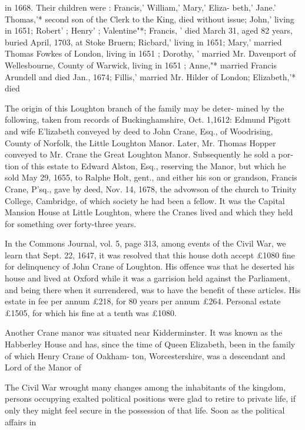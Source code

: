 \documentclass{book}
\begin{document}
in 1668. Their children were : Francis,' William,' Mary,' Eliza- 
beth,' Jane.' Thomas,'* second son of the Clerk to the King, 
died without issue; John,' living in 1651; Robert' ; Henry' ; 
Valentine"*; Francis, ' died March 31, aged 82 years, buried 
April, 1703, at Stoke Bruern; Ricbard,' living in 1651; Mary,' 
married Thomas Fowkes of London, living in 1651 ; Dorothy, ' 
married Mr. Davenport of Wellesbourne, County of Warwick, 
living in 1651 ; Anne,"* married Francis Arundell and died Jan., 
1674; Fillis,' married Mr. Hilder of London; Elizabeth,'* died 

The origin of this Loughton branch of the family may be deter- 
mined by the following, taken from records of Buckinghamshire, 
Oct. 1,1612: Edmund Pigott and wife E'lizabeth conveyed by deed 
to John Crane, Esq., of Woodrising, County of Norfolk, the Little 
Loughton Manor. Later, Mr. Thomas Hopper conveyed to Mr. 
Crane the Great Loughton Manor. Subsequently he sold a por- 
tion of this estate to Edward Alston, Esq., reserving the Manor, 
but which he sold May 29, 1655, to Ralphe Holt, gent., and 
either his son or grandson, Francis Crane, P'sq., gave by deed, 
Nov. 14, 1678, the advowson of the church to Trinity College, 
Cambridge, of which society he had been a fellow. It was the 
Capital Mansion House at Little Loughton, where the Cranes 
lived and which they held for something over forty-three years. 

In the Commons Journal, vol. 5, page 313, among events of the 
Civil War, we learn that Sept. 22, 1647, it was resolved that this 
house doth accept £1080 fine for delinquency of John Crane of 
Loughton. His offence was that he deserted his house and lived 
at Oxford while it was a garrision held against the Parliament, 
and being there when it surrendered, was to have the benefit of 
these articles. His estate in fee per annum £218, for 80 years 
per annum £264. Personal estate £1505, for which his fine at a 
tenth was £1080. 

Another Crane manor was situated near Kidderminster. It was 
known as the Habberley House and has, since the time of Queen 
Elizabeth, been in the family of which Henry Crane of Oakham- 
ton, Worcestershire, was a descendant and Lord of the Manor of 

The Civil War wrought many changes among the inhabitants 
of the kingdom, persons occupying exalted political positions 
were glad to retire to private life, if only they might feel secure 
in the possession of that life. Soon as the political affairs in 
\end{document}
